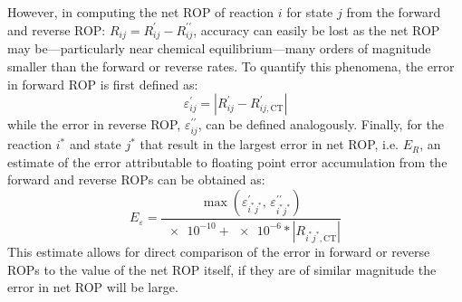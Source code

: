 \documentclass[12pt,number,sort&compress,preprint]{elsarticle}
\begin{document}
However, in computing the net ROP of reaction $i$ for state $j$ from the forward and reverse ROP: $R_{ij} = R_{ij}^{\prime} - R_{ij}^{\prime\prime}$, accuracy can easily be lost as the net ROP may be---particularly near chemical equilibrium---many orders of magnitude smaller than the forward or reverse rates.
To quantify this phenomena, the error in forward ROP is first defined as:
\begin{equation}
\varepsilon^{\prime}_{ij} = \left\lvert R_{ij}^{\prime} - R_{ij,\text{CT}}^{\prime} \right\rvert
\end{equation}
while the error in reverse ROP, $\varepsilon^{\prime\prime}_{ij}$, can be defined analogously.
Finally, for the reaction $i^{*}$ and state $j^{*}$ that result in the largest error in net ROP, i.e. $E_{R}$, an estimate of the error attributable to floating point error accumulation from the forward and reverse ROPs can be obtained as:
\begin{equation}
E_{\varepsilon} = \frac{\max(\varepsilon^{\prime}_{i^{*}j^{*}}\text{, }\varepsilon^{\prime\prime}_{i^{*}j^{*}})}{\num{e-10} + \num{e-6} * \left\lvert R_{i^{*}j^{*},\text{CT}} \right\rvert}
\end{equation}
This estimate allows for direct comparison of the error in forward or reverse ROPs to the value of the net ROP itself, if they are of similar magnitude the error in net ROP will be large.
\end{document}
